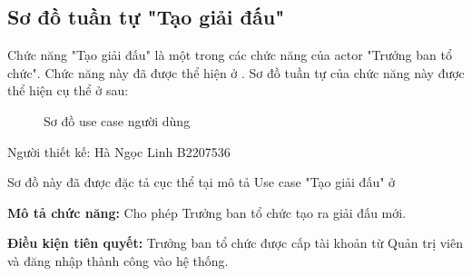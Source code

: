\subsection{Sơ đồ tuần tự "Tạo giải đấu"}
\setcounter{figure}{0}

Chức năng "Tạo giải đấu" là một trong các chức năng của actor "Trưởng ban tổ chức".
Chức năng này đã được thể hiện ở \myref{}.
Sơ đồ tuần tự của chức năng này được thể hiện cụ thể ở  sau:

\begin{figure}[H]
      \centering
      
      \caption{Sơ đồ use case người dùng}
      \label{fig:sd-1}
\end{figure}

Người thiết kế: Hà Ngọc Linh B2207536

Sơ đồ này đã được đặc tả cục thể tại mô tả Use case "Tạo giải đấu" ở

\noindent
\textbf{Mô tả chức năng:} Cho phép Trưởng ban tổ chức tạo ra giải đấu mới.

\noindent
\textbf{Điều kiện tiên quyết:} Trưởng ban tổ chức được cấp tài khoản từ Quản trị viên và đăng nhập thành công vào hệ thống.

